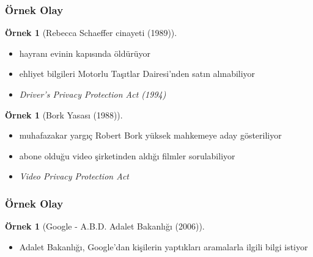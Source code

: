\documentclass[dvipsnames]{beamer}
\theoremstyle{definition}
\theoremstyle{example}
\newtheorem{ornek}[theorem]{Örnek}
\theoremstyle{plain}
\begin{document}
\begin{frame}
  \frametitle{Örnek Olay}

  \begin{ornek}[Rebecca Schaeffer cinayeti (1989)]
    \begin{itemize}
      \item hayranı evinin kapısında öldürüyor
      \item ehliyet bilgileri Motorlu Taşıtlar Dairesi'nden satın alınabiliyor

      \pause
      \medskip
      \item \emph{Driver's Privacy Protection Act (1994)}
    \end{itemize}
  \end{ornek}

  \pause
  \begin{ornek}[Bork Yasası (1988)]
    \begin{itemize}
      \item muhafazakar yargıç Robert Bork yüksek mahkemeye aday gösteriliyor
      \item abone olduğu video şirketinden aldığı filmler sorulabiliyor

      \pause
      \medskip
      \item \emph{Video Privacy Protection Act}
    \end{itemize}
  \end{ornek}
\end{frame}

\begin{frame}
  \frametitle{Örnek Olay}

  \begin{ornek}[Google - A.B.D. Adalet Bakanlığı (2006)]
    \begin{itemize}
      \item Adalet Bakanlığı, Google'dan kişilerin yaptıkları aramalarla ilgili
        bilgi istiyor
    \end{itemize}
  \end{ornek}
\end{frame}
\end{document}
